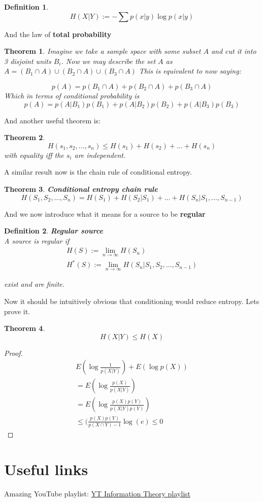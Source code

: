 \documentclass[titlepage]{article}
\newtheorem{theorem}{Theorem}[section]
\newtheorem{definition}{Definition}
\begin{document}
\begin{definition}
$$H(X|Y) := - \sum p(x|y)\log p(x|y)$$
\end{definition}

And the law of \textbf{total probability}

\begin{theorem}
Imagine we take a sample space with some subset $A$ and cut it into 3 disjoint units $B_{i}$. Now we may describe the set $A$ as $A = (B_{1} \cap A) \cup (B_{2} \cap A) \cup (B_{3} \cap A)$ This is equivalent to now saying:

$$p(A) = p(B_{1} \cap A) + p(B_{2} \cap A) + p(B_{3} \cap A) $$
Which in terms of conditional probability is $$p(A) = p(A|B_{1})p(B_{1}) + p(A|B_{2})p(B_{2}) + p(A|B_{3})p(B_{3})$$
\end{theorem}

And another useful theorem is:

\begin{theorem}
$$H(s_{1},s_{2},\ldots,s_{n}) \leq H(s_{1}) + H(s_{2}) + \ldots + H(s_{n})$$
with equality iff the $s_{i}$ are independent. 
\end{theorem}

A similar result now is the chain rule of conditional entropy.
\begin{theorem}\textbf{Conditional entropy chain rule}
$$H(S_{1},S_{2},\ldots,S_{n}) = H(S_{1}) + H(S_{2}|S_{1}) + \ldots + H(S_{n}|S_{1},\ldots,S_{n-1})$$
\end{theorem}

And we now introduce what it means for a source to be \textbf{regular}

\begin{definition}\textbf{Regular source}
\\
A source is regular if
\begin{align*}
    H(S) := \lim_{n\to\infty} H(S_{n})\\
    H^{*}(S) := \lim_{n \to \infty} H(S_{n}|S_{1},S_{2},\ldots,S_{n-1})
\end{align*}

exist and are finite. 
\end{definition}

Now it should be intuitively obvious that conditioning would reduce entropy. Lets prove it.

\begin{theorem}
$$H(X|Y) \leq H(X)$$
\end{theorem}

\begin{proof}
\begin{align*}
    E(\log\frac{1}{p(X|Y)}) + E(\log p(X))\\
    = E(\log\frac{p(X)}{p(X|Y)})\\
    = E(\log\frac{p(X)p(Y)}{p(X|Y)p(Y)})\\
    \leq (\frac{p(X)p(Y)}{p(X\cap Y) - 1}\log(e)
    \leq 0
\end{align*}
\end{proof}


\section{Useful links}
Amazing YouTube playlist: \hyperlink{ https://www.youtube.com/playlist?list=PLE125425EC837021F}{YT Information Theory playlist}
\end{document}
